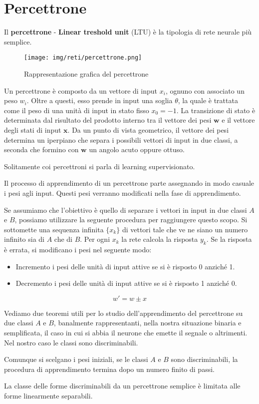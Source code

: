 \section{Percettrone}
Il \textbf{percettrone} - \textbf{Linear treshold unit} (LTU) è la tipologia di rete neurale più semplice.
\begin{figure}[!ht]
    \centering
    \texttt{[image: img/reti/percettrone.png]}
    \caption{Rappresentazione grafica del percettrone}
\end{figure}

Un percettrone è composto da un vettore di input $x_i$, ognuno con associato un peso $w_i$. Oltre a questi, esso prende in input una soglia $\theta$, la quale è trattata come il peso di una unità di input in stato fisso $x_0 = -1$. La transizione di stato è determinata dal risultato del prodotto interno tra il vettore dei pesi $\textbf{w}$ e il vettore degli stati di input $\textbf{x}$. Da un punto di vista geometrico, il vettore dei pesi determina un iperpiano che separa i possibili vettori di input in due classi, a seconda che formino con $\textbf{w}$ un angolo acuto oppure ottuso.

Solitamente coi percettroni si parla di learning supervisionato.

Il processo di apprendimento di un percettrone parte assegnando in modo casuale i pesi agli input. Questi pesi verranno modificati nella fase di apprendimento. 

Se assumiamo che l'obiettivo è quello di separare i vettori in input in due classi $A$ e $B$, possiamo utilizzare la seguente procedura per raggiungere questo scopo. Si sottomette una sequenza infinita $\{x_k\}$ di vettori tale che ve ne siano un numero infinito sia di $A$ che di $B$. Per ogni $x_k$ la rete calcola la risposta $y_k$. Se la risposta è errata, si modificano i pesi nel seguente modo:
\begin{itemize}
    \item Incremento i pesi delle unità di input attive se si è risposto 0 anziché 1.
    \item Decremento i pesi delle unità di input attive se si è risposto 1 anziché 0.
\end{itemize}
\begin{equation}
    w' = w \pm x
\end{equation}

Vediamo due teoremi utili per lo studio dell'apprendimento del percettrone su due classi $A$ e $B$, banalmente rappresentanti, nella nostra situazione binaria e semplificata, il caso in cui si abbia il neurone che emette il segnale o altrimenti. Nel nostro caso le classi sono discriminabili.
\begin{teorema}
    Comunque si scelgano i pesi iniziali, se le classi $A$ e $B$ sono discriminabili, la procedura di apprendimento termina dopo un numero finito di passi.
\end{teorema}
\begin{teorema}
    La classe delle forme discriminabili da un percettrone semplice è limitata alle forme linearmente separabili.
\end{teorema}


